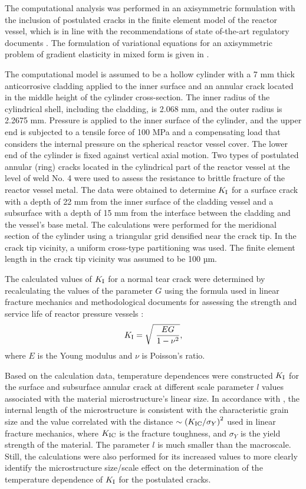 The computational analysis was performed in an axisymmetric formulation with the inclusion of postulated cracks in the finite element model of the reactor vessel, which is in line with the recommendations of state of-the-art regulatory documents \cite{Chirkov67, Chirkov68}. The formulation of variational equations for an axisymmetric problem of gradient elasticity in mixed form is given in \cite{Chirkov42}.

The computational model is assumed to be a hollow cylinder with a 7 mm thick anticorrosive cladding applied to the inner surface and an annular crack located in the middle height of the cylinder cross-section. The inner radius of the cylindrical shell, including the cladding, is 2.068 mm, and the outer radius is 2.2675 mm. Pressure is applied to the inner surface of the cylinder, and the upper end is subjected to a tensile force of 100 MPa and a compensating load that considers the internal pressure on the spherical reactor vessel cover. The lower end of the cylinder is fixed against vertical axial motion. Two types of postulated annular (ring) cracks located in the cylindrical part of the reactor vessel at the level of weld No. 4 were used to assess the resistance to brittle fracture of the reactor vessel metal. The data were obtained to determine $K_{{\rm I}}$ for a surface crack with a depth of 22 mm from the inner surface of the cladding vessel and a subsurface with a depth of 15 mm from the interface between the cladding and the vessel's base metal. The calculations were performed for the meridional section of the cylinder using a triangular grid densified near the crack tip. In the crack tip vicinity, a uniform cross-type partitioning was used. The finite element length in the crack tip vicinity was assumed to be 100 µm.

The calculated values of $K_{{\rm I}}$ for a normal tear crack were determined by recalculating the values of the parameter $G$ using the formula used in linear fracture mechanics and methodological documents for assessing the strength and service life of reactor pressure vessels \cite{Chirkov67, Chirkov68}:
\[K_{{\rm I}}=\sqrt{\ \frac{EG}{1-
		\nu^2}},
\] 
where $E$ is the Young modulus and $\nu$ is Poisson's ratio.

Based on the calculation data, temperature dependences were constructed $K_{{\rm I}}$ for the surface and subsurface annular crack at different scale parameter $l$ values associated with the material microstructure's linear size. In accordance with \cite{Chirkov69}, the internal length of the microstructure is consistent with the characteristic grain size and the value correlated with the distance $\sim {\left({K_{{\rm IC}}}/{\sigma_Y}\right)}^2$ used in linear fracture mechanics, where $K_{{\rm IC}}$ is the fracture toughness, and $\sigma_Y$ is the yield strength of the material. The parameter $l$ is much smaller than the macroscale. Still, the calculations were also performed for its increased values to more clearly identify the microstructure size/scale effect on the determination of the temperature dependence of $K_{{\rm I}}$ for the postulated cracks.

